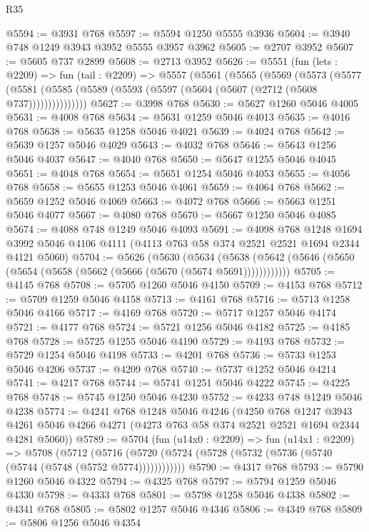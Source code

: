 \begin{lexlean}{R35}
\begin{coremodule}
@5594 := @3931 @768
@5597 := @5594 @1250 @5555 @3936
@5604 := @3940 @748 @1249 @3943 @3952 @5555 @3957 @3962
@5605 := @2707 @3952
@5607 := @5605 @737 @2899
@5608 := @2713 @3952
@5626 := @5551
    (fun (lets : @2209) =>
    fun (tail : @2209) =>
    @5557
      (@5561
        (@5565
          (@5569
            (@5573
              (@5577
                (@5581 (@5585 (@5589 (@5593 (@5597 (@5604 (@5607 (@2712 (@5608 @737)))))))))))))))
@5627 := @3998 @768
@5630 := @5627 @1260 @5046 @4005
@5631 := @4008 @768
@5634 := @5631 @1259 @5046 @4013
@5635 := @4016 @768
@5638 := @5635 @1258 @5046 @4021
@5639 := @4024 @768
@5642 := @5639 @1257 @5046 @4029
@5643 := @4032 @768
@5646 := @5643 @1256 @5046 @4037
@5647 := @4040 @768
@5650 := @5647 @1255 @5046 @4045
@5651 := @4048 @768
@5654 := @5651 @1254 @5046 @4053
@5655 := @4056 @768
@5658 := @5655 @1253 @5046 @4061
@5659 := @4064 @768
@5662 := @5659 @1252 @5046 @4069
@5663 := @4072 @768
@5666 := @5663 @1251 @5046 @4077
@5667 := @4080 @768
@5670 := @5667 @1250 @5046 @4085
@5674 := @4088 @748 @1249 @5046 @4093
@5691 := @4098
    @768
    @1248
    @1694
    @3992
    @5046
    @4106
    @4111
    (@4113 @763 @58 @374 @2521 @2521 @1694 @2344 @4121 @5060)
@5704 := @5626
    (@5630
      (@5634 (@5638 (@5642 (@5646 (@5650 (@5654 (@5658 (@5662 (@5666 (@5670 (@5674 @5691))))))))))))
@5705 := @4145 @768
@5708 := @5705 @1260 @5046 @4150
@5709 := @4153 @768
@5712 := @5709 @1259 @5046 @4158
@5713 := @4161 @768
@5716 := @5713 @1258 @5046 @4166
@5717 := @4169 @768
@5720 := @5717 @1257 @5046 @4174
@5721 := @4177 @768
@5724 := @5721 @1256 @5046 @4182
@5725 := @4185 @768
@5728 := @5725 @1255 @5046 @4190
@5729 := @4193 @768
@5732 := @5729 @1254 @5046 @4198
@5733 := @4201 @768
@5736 := @5733 @1253 @5046 @4206
@5737 := @4209 @768
@5740 := @5737 @1252 @5046 @4214
@5741 := @4217 @768
@5744 := @5741 @1251 @5046 @4222
@5745 := @4225 @768
@5748 := @5745 @1250 @5046 @4230
@5752 := @4233 @748 @1249 @5046 @4238
@5774 := @4241
    @768
    @1248
    @5046
    @4246
    (@4250
      @768
      @1247
      @3943
      @4261
      @5046
      @4266
      @4271
      (@4273 @763 @58 @374 @2521 @2521 @1694 @2344 @4281 @5060))
@5789 := @5704
    (fun (u14x0 : @2209) =>
    fun (u14x1 : @2209) =>
    @5708
      (@5712 (@5716 (@5720 (@5724 (@5728 (@5732 (@5736 (@5740 (@5744 (@5748 (@5752 @5774))))))))))))
@5790 := @4317 @768
@5793 := @5790 @1260 @5046 @4322
@5794 := @4325 @768
@5797 := @5794 @1259 @5046 @4330
@5798 := @4333 @768
@5801 := @5798 @1258 @5046 @4338
@5802 := @4341 @768
@5805 := @5802 @1257 @5046 @4346
@5806 := @4349 @768
@5809 := @5806 @1256 @5046 @4354

\end{coremodule}
\end{lexlean}
